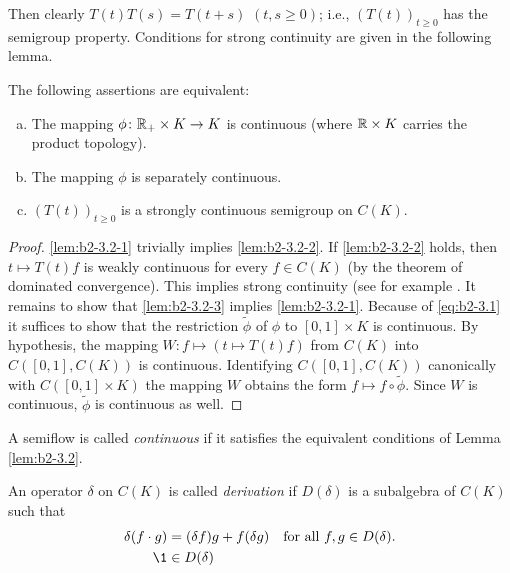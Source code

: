 Then clearly $T(t)T(s) = T(t+s)$ $(t,s\geq 0)$; i.e., $(T(t))_{t \geq 0}$ has the
semigroup property.
Conditions for strong continuity are given in the following lemma.

\begin{lemma}\label{lem:b2-3.2}
The following assertions are equivalent:
\begin{enumerate}[(a)]
\item \label{lem:b2-3.2-1}
The mapping $\phi \colon \mathbb{R}_{+} \times K \to K$ is continuous (where $\mathbb{R} \times K$ carries the product topology).
\item \label{lem:b2-3.2-2}
The mapping $\phi$ is separately continuous.
\item \label{lem:b2-3.2-3}
$(T(t))_{t \geq 0}$ is a strongly continuous semigroup on $C(K)$.
\end{enumerate}
\end{lemma}

\begin{proof}
\ref{lem:b2-3.2-1} trivially implies \ref{lem:b2-3.2-2}.
If \ref{lem:b2-3.2-2} holds, then $t \mapsto T(t)f$ is weakly continuous for every $f \in C(K)$ (by the theorem of dominated convergence).
This implies strong continuity (see for example \citet[Proposition 1.23]{davies:1980}.
It remains to show that \ref{lem:b2-3.2-3} implies \ref{lem:b2-3.2-1}.
Because of \eqref{eq:b2-3.1} it suffices to show that the restriction $\tilde{\phi}$ of $\phi$ to $[0,1] \times K$ is continuous.
By hypothesis, the mapping $W \colon f \mapsto (t \mapsto T(t)f)$ from $C(K)$ into $C([0,1],C(K))$ is continuous.
Identifying $C([0,1],C(K))$ canonically with $C([0,1] \times K)$ the mapping $W$ obtains the form $f \mapsto f \circ \tilde{\phi}$.
Since $W$ is continuous, $\tilde{\phi}$ is continuous as well.
\end{proof}

A semiflow is called \emph{continuous} if it satisfies the equivalent conditions of Lemma \ref{lem:b2-3.2}.

\begin{definition}\label{def:b2-3.3}
An operator $\delta$ on $C(K)$ is called \emph{derivation} if $D(\delta)$ is a subalgebra of $C(K)$ such that
\begin{align}
\delta(f \cdot g) &= (\delta f)g + f(\delta g) \quad \text{for all } f,g \in D(\delta). \label{eq:b2-3.4} \\
\1 &\in D(\delta) \label{eq:b2-3.5}
\end{align}
\end{definition}

